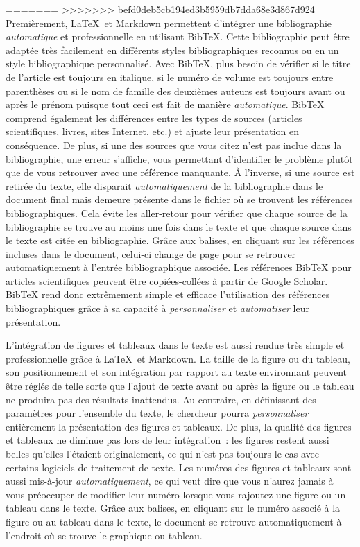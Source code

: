 \documentclass[
  letterpaper,
]{scrbook}
\begin{document}
=======
>>>>>>> befd0deb5cb194ed3b5959db7dda68e3d867d924
Premièrement, \LaTeX~et Markdown permettent d'intégrer une bibliographie
\emph{automatique} et professionnelle en utilisant BibTeX. Cette
bibliographie peut être adaptée très facilement en différents styles
bibliographiques reconnus ou en un style bibliographique personnalisé.
Avec BibTeX, plus besoin de vérifier si le titre de l'article est
toujours en italique, si le numéro de volume est toujours entre
parenthèses ou si le nom de famille des deuxièmes auteurs est toujours
avant ou après le prénom puisque tout ceci est fait de manière
\emph{automatique}. BibTeX comprend également les différences entre les
types de sources (articles scientifiques, livres, sites Internet, etc.)
et ajuste leur présentation en conséquence. De plus, si une des sources
que vous citez n'est pas inclue dans la bibliographie, une erreur
s'affiche, vous permettant d'identifier le problème plutôt que de vous
retrouver avec une référence manquante. À l'inverse, si une source est
retirée du texte, elle disparait \emph{automatiquement} de la
bibliographie dans le document final mais demeure présente dans le
fichier où se trouvent les références bibliographiques. Cela évite les
aller-retour pour vérifier que chaque source de la bibliographie se
trouve au moins une fois dans le texte et que chaque source dans le
texte est citée en bibliographie. Grâce aux balises, en cliquant sur les
références incluses dans le document, celui-ci change de page pour se
retrouver automatiquement à l'entrée bibliographique associée. Les
références BibTeX pour articles scientifiques peuvent être
copiées-collées à partir de Google Scholar. BibTeX rend donc extrêmement
simple et efficace l'utilisation des références bibliographiques grâce à
sa capacité à \emph{personnaliser} et \emph{automatiser} leur
présentation.

L'intégration de figures et tableaux dans le texte est aussi rendue très
simple et professionnelle grâce à \LaTeX~et Markdown. La taille de la
figure ou du tableau, son positionnement et son intégration par rapport
au texte environnant peuvent être réglés de telle sorte que l'ajout de
texte avant ou après la figure ou le tableau ne produira pas des
résultats inattendus. Au contraire, en définissant des paramètres pour
l'ensemble du texte, le chercheur pourra \emph{personnaliser}
entièrement la présentation des figures et tableaux. De plus, la qualité
des figures et tableaux ne diminue pas lors de leur intégration~: les
figures restent aussi belles qu'elles l'étaient originalement, ce qui
n'est pas toujours le cas avec certains logiciels de traitement de
texte. Les numéros des figures et tableaux sont aussi mis-à-jour
\emph{automatiquement}, ce qui veut dire que vous n'aurez jamais à vous
préoccuper de modifier leur numéro lorsque vous rajoutez une figure ou
un tableau dans le texte. Grâce aux balises, en cliquant sur le numéro
associé à la figure ou au tableau dans le texte, le document se retrouve
automatiquement à l'endroit où se trouve le graphique ou tableau.
\end{document}
